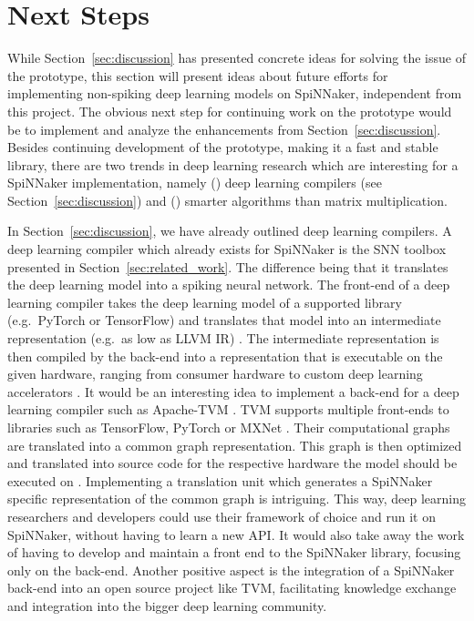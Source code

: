 \documentclass[]{article}
\begin{document}


\section{Next Steps} %
\label{sec:next_steps}

While Section~\ref{sec:discussion} has presented concrete ideas for
solving the issue of the prototype, this section will present ideas
about future efforts for implementing non-spiking deep learning models
on SpiNNaker, independent from this project.
The obvious next step for continuing work on the prototype would be
to implement and analyze the enhancements from
Section~\ref{sec:discussion}.
Besides continuing development of the prototype, making it a fast
and stable library, there are two trends in deep learning research
which are interesting for a SpiNNaker implementation, namely
() deep learning compilers
(see Section~\ref{sec:discussion}) and ()
smarter algorithms than matrix multiplication.

In Section~\ref{sec:discussion}, we have already outlined deep
learning compilers.
A deep learning compiler which already exists for SpiNNaker is the
SNN toolbox presented in Section~\ref{sec:related_work}.
The difference being that it translates the deep learning model into
a spiking neural network.
The front-end of a deep learning compiler takes the deep learning
model of a supported library (e.g.\ PyTorch or TensorFlow) and
translates that model into an intermediate representation (e.g.\
as low as LLVM IR) \citep{li_et_al_2020}.
The intermediate representation is then compiled by the back-end into
a representation that is executable on the given hardware, ranging
from consumer hardware to custom deep learning accelerators
\citep{li_et_al_2020}.
It would be an interesting idea to implement a back-end for a
deep learning compiler such as Apache-TVM \citep{chen_et_al_2018}.
TVM supports multiple front-ends to libraries such as TensorFlow,
PyTorch or MXNet \citep{chen_et_al_2015, chen_et_al_2018}.
Their computational graphs are translated into a common graph
representation.
This graph is then optimized and translated into source code for
the respective hardware the model should be executed on
\citep{chen_et_al_2018}.
Implementing a translation unit which generates a SpiNNaker specific
representation of the common graph is intriguing.
This way, deep learning researchers and developers could use their
framework of choice and run it on SpiNNaker, without having to
learn a new API.
It would also take away the work of having to develop and maintain
a front end to the SpiNNaker library, focusing only on the back-end.
Another positive aspect is the integration of a SpiNNaker back-end
into an open source project like TVM, facilitating knowledge exchange
and integration into the bigger deep learning community.
\end{document}
